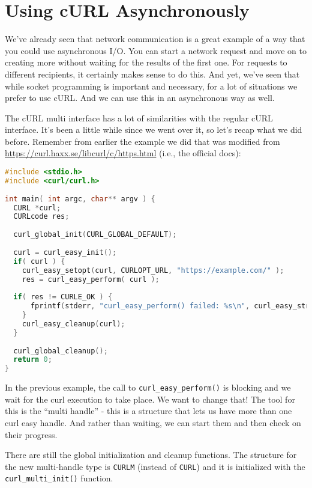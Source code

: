 




\section*{Using cURL Asynchronously}
We've already seen that network communication is a great example of a way that you could use asynchronous  I/O. You can start a network request and move on to creating more without waiting for the results of the first one. For requests to different recipients, it certainly makes sense to do this. And yet, we've seen that while socket programming is important and necessary, for a lot of situations we prefer to use cURL. And we can use this in an asynchronous way as well.

The cURL multi interface has a lot of similarities with the regular cURL interface. It's been a little while since we went over it, so let's recap what we did before. Remember from earlier the example we did that was modified from \url{https://curl.haxx.se/libcurl/c/https.html} (i.e., the official docs):

\begin{lstlisting}[language=C]
#include <stdio.h>
#include <curl/curl.h>
 
int main( int argc, char** argv ) {
  CURL *curl;
  CURLcode res;
 
  curl_global_init(CURL_GLOBAL_DEFAULT);
 
  curl = curl_easy_init();
  if( curl ) {
    curl_easy_setopt(curl, CURLOPT_URL, "https://example.com/" );
    res = curl_easy_perform( curl );
    
  if( res != CURLE_OK ) {
      fprintf(stderr, "curl_easy_perform() failed: %s\n", curl_easy_strerror(res));
    }
    curl_easy_cleanup(curl);
  }
 
  curl_global_cleanup();
  return 0;
}
\end{lstlisting}

In the previous example, the call to \texttt{curl\_easy\_perform()} is blocking and we wait for the curl execution to take place. We want to change that! The tool for this is the ``multi handle'' - this is a structure that lets us have more than one curl easy handle. And rather than waiting, we can start them and then check on their progress.

There are still the global initialization and cleanup functions. The structure for the new multi-handle type is \texttt{CURLM} (instead of \texttt{CURL}) and it is initialized with the \texttt{curl\_multi\_init()} function.

